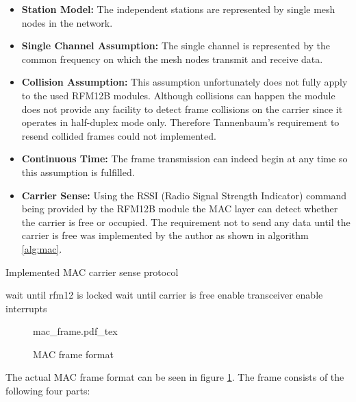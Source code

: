 \begin{itemize}
    \item \textbf{Station Model:} The independent stations are represented by single mesh nodes in the network.
    \item \textbf{Single Channel Assumption:} The single channel is represented by the common frequency on which the mesh nodes transmit and receive data.
    \item \textbf{Collision Assumption:} This assumption unfortunately does not fully apply to the used RFM12B modules. Although collisions can happen the module does not provide any facility to detect frame collisions on the carrier since it operates in half-duplex mode only. Therefore Tannenbaum's requirement to resend collided frames could not implemented.
    \item \textbf{Continuous Time:} The frame transmission can indeed begin at any time so this assumption is fulfilled.
    \item \textbf{Carrier Sense:} Using the RSSI (Radio Signal Strength Indicator) command being provided by the RFM12B module the MAC layer can detect whether the carrier is free or occupied. The requirement not to send any data until the carrier is free was implemented by the author as shown in algorithm \ref{alg:mac}.
\end{itemize}

\begin{algorithm}[H]
\caption{Implemented MAC carrier sense protocol}
\label{alg:mac}
\begin{algorithmic}
\STATE wait until rfm12 is locked
    \STATE wait until carrier is free
\ENDIF
\STATE enable transceiver
\STATE enable interrupts
\end{algorithmic}
\end{algorithm}

\begin{figure}[H]
    \centering
    {mac_frame.pdf_tex}
    \caption{MAC frame format}
    \label{fig:mac}
\end{figure}

The actual MAC frame format can be seen in figure \ref{fig:mac}. The frame consists of the following four parts:

